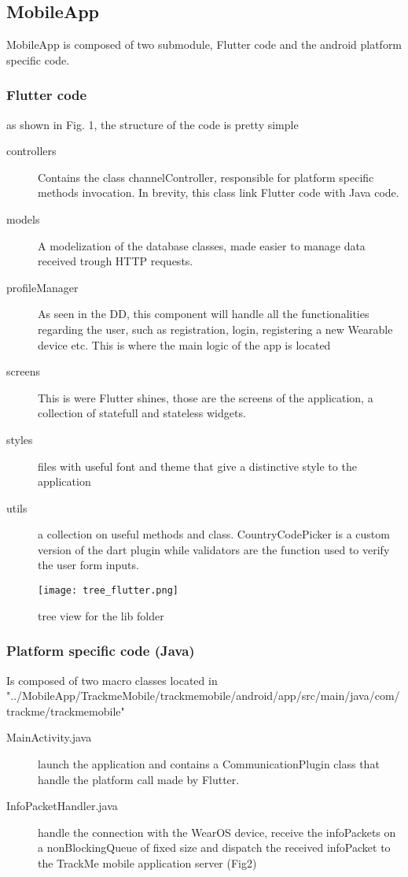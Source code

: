 \documentclass[../main.tex]{subfiles}
\begin{document}
\subsection{MobileApp}
MobileApp is composed of two submodule, Flutter code and the android platform specific code.

\subsubsection{Flutter code}
as shown in Fig. 1, the structure of the code is pretty simple
\begin{description}
	\item[controllers] Contains the class channelController, responsible for platform specific methods invocation. In brevity, this class link Flutter code with Java code.
	\item[models] A modelization of the database classes, made easier to manage data received trough HTTP requests.
	\item[profileManager] As seen in the DD, this component will handle all the functionalities regarding the user, such as registration, login, registering a new Wearable device etc. This is where the main logic of the app is located
	\item[screens] This is were Flutter shines, those are the screens of the application, a collection of statefull and stateless widgets.
	\item[styles] files with useful font and theme that give a distinctive style to the application
	\item[utils] a collection on useful methods and class. CountryCodePicker is a custom version of the dart plugin while validators are the function used to verify the user form inputs.
\end{description}





	\begin{figure}[H]
		\centering
		\texttt{[image: tree\_flutter.png]}
		\caption{tree view for the lib folder}
		\label{fig:lib_tree.png}
	\end{figure}

\subsubsection{Platform specific code (Java)}
Is composed of two macro classes located in \\ "../MobileApp/TrackmeMobile/trackmemobile/android/app/src/main/java/com/trackme/trackmemobile"
\begin{description}
	\item[MainActivity.java] launch the application and contains a CommunicationPlugin class that handle the platform call made by Flutter.
	\item[InfoPacketHandler.java] handle the connection with the WearOS device, receive the infoPackets on a nonBlockingQueue of fixed size and dispatch the received infoPacket to the TrackMe mobile application server (Fig2)
\end{description}
\end{document}
